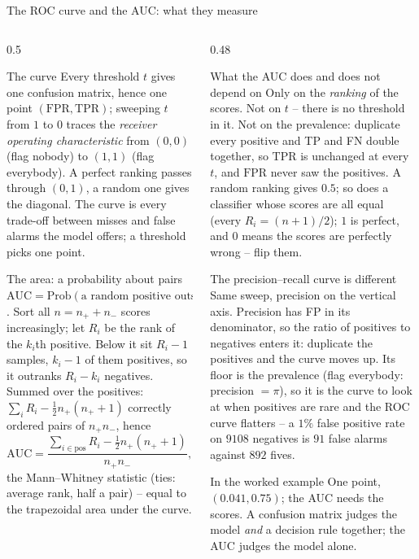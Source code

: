 \documentclass[10pt,aspectratio=169]{beamer}
\begin{document}
\begin{frame}{The ROC curve and the AUC: what they measure}
\small
\begin{columns}[T]
\begin{column}{0.5\textwidth}
\begin{block}{The curve}
\scriptsize
Every threshold $t$ gives one confusion matrix, hence one point
$(\mathrm{FPR},\mathrm{TPR})$; sweeping $t$ from $1$ to $0$ traces the
\emph{receiver operating characteristic} from $(0,0)$ (flag nobody) to
$(1,1)$ (flag everybody).  A perfect ranking passes through $(0,1)$, a
random one gives the diagonal.  The curve is every trade-off between
misses and false alarms the model offers; a threshold picks one point.
\end{block}
\begin{block}{The area: a probability about pairs}
\scriptsize
$\mathrm{AUC}=\mathrm{Prob}(\text{a random positive outscores a random
negative})$.  Sort all $n=n_++n_-$ scores increasingly; let $R_i$ be the
rank of the $k_i$th positive.  Below it sit $R_i-1$ samples, $k_i-1$ of
them positives, so it outranks $R_i-k_i$ negatives.  Summed over the
positives: $\sum_iR_i-\tfrac12n_+(n_++1)$ correctly ordered pairs of
$n_+n_-$, hence
\[
  \mathrm{AUC}=\frac{\sum_{i\in\mathrm{pos}}R_i-\tfrac12n_+(n_++1)}{n_+n_-},
\]
the Mann--Whitney statistic (ties: average rank, half a pair) -- equal to
the trapezoidal area under the curve.
\end{block}
\end{column}
\begin{column}{0.48\textwidth}
\begin{block}{What the AUC does and does not depend on}
\scriptsize
Only on the \emph{ranking} of the scores.  Not on $t$ -- there is no
threshold in it.  Not on the prevalence: duplicate every positive and TP
and FN double together, so $\mathrm{TPR}$ is unchanged at every $t$, and
$\mathrm{FPR}$ never saw the positives.  A random ranking gives $0.5$; so
does a classifier whose scores are all equal (every $R_i=(n+1)/2$);
$1$ is perfect, and $0$ means the scores are perfectly wrong -- flip them.
\end{block}
\begin{block}{The precision--recall curve is different}
\scriptsize
Same sweep, precision on the vertical axis.  Precision has FP in its
denominator, so the ratio of positives to negatives enters it: duplicate
the positives and the curve moves up.  Its floor is the prevalence (flag
everybody: precision $=\pi$), so it is the curve to look at when positives
are rare and the ROC curve flatters -- a $1\%$ false positive rate on
$9108$ negatives is $91$ false alarms against $892$ fives.
\end{block}
\begin{block}{In the worked example}
\scriptsize
One point, $(0.041,0.75)$; the AUC needs the scores.  A confusion matrix
judges the model \emph{and} a decision rule together; the AUC judges the
model alone.
\end{block}
\end{column}
\end{columns}
\end{frame}
\end{document}
